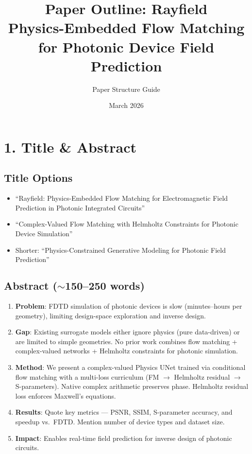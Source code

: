 \documentclass[11pt,letterpaper]{article}
\title{\textbf{Paper Outline: Rayfield} \\ \large Physics-Embedded Flow Matching for Photonic Device Field Prediction}
\author{Paper Structure Guide}
\date{March 2026}
\begin{document}
\maketitle
\tableofcontents
\newpage

\section{1. Title \& Abstract}

\subsection{Title Options}
\begin{itemize}
    \item ``Rayfield: Physics-Embedded Flow Matching for Electromagnetic Field Prediction in Photonic Integrated Circuits''
    \item ``Complex-Valued Flow Matching with Helmholtz Constraints for Photonic Device Simulation''
    \item Shorter: ``Physics-Constrained Generative Modeling for Photonic Field Prediction''
\end{itemize}

\subsection{Abstract ($\sim$150--250 words)}
\begin{enumerate}
    \item \textbf{Problem}: FDTD simulation of photonic devices is slow (minutes--hours per geometry), limiting design-space exploration and inverse design.
    \item \textbf{Gap}: Existing surrogate models either ignore physics (pure data-driven) or are limited to simple geometries. No prior work combines flow matching + complex-valued networks + Helmholtz constraints for photonic simulation.
    \item \textbf{Method}: We present a complex-valued Physics UNet trained via conditional flow matching with a multi-loss curriculum (FM $\to$ Helmholtz residual $\to$ S-parameters). Native complex arithmetic preserves phase. Helmholtz residual loss enforces Maxwell's equations.
    \item \textbf{Results}: Quote key metrics --- PSNR, SSIM, S-parameter accuracy, and speedup vs.\ FDTD. Mention number of device types and dataset size.
    \item \textbf{Impact}: Enables real-time field prediction for inverse design of photonic circuits.
\end{enumerate}
\end{document}
